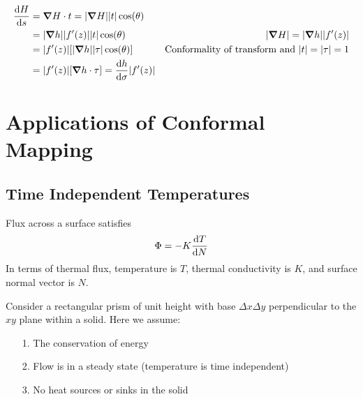 \documentclass[12pt, english]{book}
\makeatletter
\renewenvironment{proof}[1][\proofname]{\par
	\pushQED{\qed}%
	\normalfont \topsep6\p@\@plus6\p@\relax
	\list{}{%
		\settowidth{\leftmargin}{\itshape\proofname:\hskip\labelsep}%
		\setlength{\labelwidth}{0pt}%
		\setlength{\itemindent}{-\leftmargin}%
		}%
	\item[\hskip\labelsep\itshape#1\@addpunct{:}]\ignorespaces
	}{\popQED\endlist\@endpefalse}
\makeatother
\begin{document}
\begin{example}
\begin{proof}
{			\begin{align*}
				\dv{H}{s} 
				&= \grad{H} \cdot t = \abs{\grad{H}} \abs{t} \cos(\theta) \\
				&= \abs{\grad{h}} \abs{f'(z)} \abs{t} \cos(\theta) 
				 	& \abs{\grad{H}} = \abs{\grad{h}} \abs{f'(z)} \\
				&= \abs{f'(z)} [\abs{\grad{h}} \abs{\tau} \cos(\theta)]
					& \text{Conformality of transform and } \abs{t} = \abs{\tau} = 1 \\
				&= \abs{f'(z)} [\grad{h} \cdot \tau] 
				 = \dv{h}{\sigma} \abs{f'(z)}
			\end{align*}
			}
		\end{proof}
	\end{example}
	
	\section{Applications of Conformal Mapping} \label{Applications of Conformal Mapping Section - Complex}
	
	\subsection{Time Independent Temperatures} \label{Time Independent Temperatures Subsection - Complex}
	
	\begin{definition}
		\label{Fourier's Law Definition - Complex}
		Flux across a surface satisfies 
		\begin{align*}
			\Phi = - K \dv{T}{N}
		\end{align*}
		In terms of thermal flux, temperature is \(T\), thermal conductivity is \(K\), and surface normal vector is \(N\).
	\end{definition}

	Consider a rectangular prism of unit height with base \(\Delta x \Delta y\) perpendicular to the \(xy\) plane within a solid. Here we assume:
	\begin{itemize}
		\item[1.] The conservation of energy
		\item[2.] Flow is in a steady state (temperature is time independent)
		\item[3.] No heat sources or sinks in the solid
	\end{itemize}
	
\end{document}
